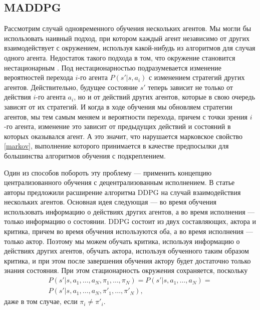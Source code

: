 \documentclass[12pt, a4paper]{extarticle}
\theoremstyle{definition}
\begin{document}
\subsection{MADDPG}
Рассмотрим случай одновременного обучения нескольких агентов. Мы могли бы использовать наивный подход, при котором каждый агент независимо от других взаимодействует с окружением, используя какой-нибудь из алгоритмов для случая одного агента. Недостаток такого подхода в том, что окружение становится нестационарным \cite{laurent2011world}. Под нестационарностью подразумевается изменение вероятностей перехода $i$-го агента $P(s'|s,a_i)$ с изменением стратегий других агентов. Действительно, будущее состояние $s'$ теперь зависит не только от действия  $i$-го агента $a_i$, но и от действий других агентов, которые в свою очередь зависят от их стратегий. И когда в ходе обучения мы обновляем стратегии агентов, мы тем самым меняем и вероятности перехода, причем с точки зрения $i$-го агента, изменение это зависит от предыдущих действий и состояний в которых оказывался агент. А это значит, что нарушается марковское свойство \ref{markov}, выполнение которого принимается в качестве предпосылки для большинства алгоритмов обучения с подкреплением.

Один из способов побороть эту проблему --- применить концепцию централизованного обучения с децентрализованным исполнением. В статье \cite{lowe2017multiagent} авторы предложили расширение алгоритма DDPG на случай взаимодействия нескольких агентов. Основная идея следующая --- во время обучения использовать информацию о действиях других агентов, а во время исполнения --- только информацию о состоянии. DDPG состоит из двух составляющих, актора и критика, причем во время обучения используются оба, а во время исполнения --- только актор. Поэтому мы можем обучать критика, используя информацию о действиях других агентов, обучать актора, используя обученного таким образом критика, и при этом после завершения обучения актору будет достаточно только знания состояния. При этом стационарность окружения сохраняется, поскольку
\begin{equation}
\begin{gathered}
P(s'|s,a_1,\ldots,a_N,\pi_1,\ldots,\pi_N)=P(s'|s,a_1,\ldots,a_N)=\\P(s'|s,a_1,\ldots,a_N,\pi'_1,\ldots,\pi'_N),
\end{gathered}
\end{equation}
даже в том случае, если $\pi_i \neq \pi'_i$.
\end{document}
